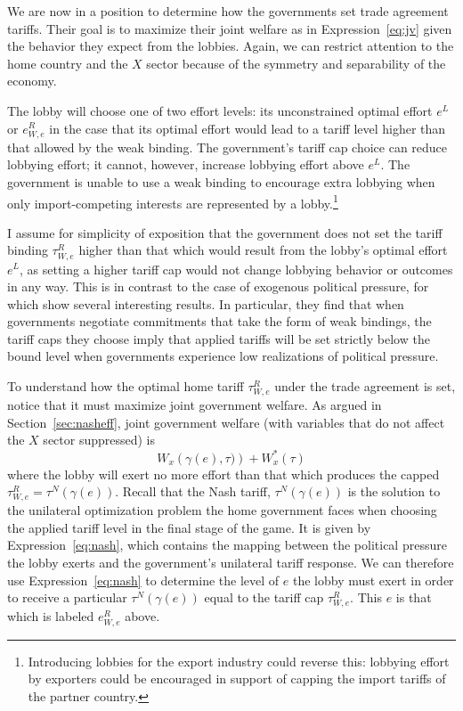\documentclass[12pt]{article}
\newcommand{\ga}{\gamma}
\begin{document}
We are now in a position to determine how the governments set trade agreement tariffs. Their goal is to maximize their joint welfare as in Expression~\ref{eq:jv} given the behavior they expect from the lobbies. Again, we can restrict attention to the home country and the $X$ sector because of the symmetry and separability of the economy.

The lobby will choose one of two effort levels: its unconstrained optimal effort $e^L$ or $e^R_{W,e}$ in the case that its optimal effort would lead to a tariff level higher than that allowed by the weak binding. The government's tariff cap choice can reduce lobbying effort; it cannot, however, increase lobbying effort above $e^L$. The government is unable to use a weak binding to encourage extra lobbying when only import-competing interests are represented by a lobby.\footnote{Introducing lobbies for the export industry could reverse this: lobbying effort by exporters could be encouraged in support of capping the import tariffs of the partner country.}

I assume for simplicity of exposition that the government does not set the tariff binding $\tau^R_{W,e}$ higher than that which would result from the lobby's optimal effort $e^L$, as setting a higher tariff cap would not change lobbying behavior or outcomes in any way. This is in contrast to the case of exogenous political pressure, for which \Textcite{bs2005} show several interesting results. In particular, they find that when governments negotiate commitments that take the form of weak bindings, the tariff caps they choose imply that applied tariffs will be set strictly below the bound level when governments experience low realizations of political pressure.

To understand how the optimal home tariff $\tau^R_{W,e}$ under the trade agreement is set, notice that it must maximize joint government welfare. As argued in Section~\ref{sec:nasheff}, joint government welfare (with variables that do not affect the $X$ sector suppressed) is
  \begin{equation}
		W_x \left(\ga(e),\tau) \right) + W_x^*\left(\tau \right)
	  \label{exp:1}
	\end{equation}
where the lobby will exert no more effort than that which produces the capped $\tau^R_{W,e}=\tau^N(\ga(e))$. Recall that the Nash tariff, $\tau^N(\ga(e))$ is the solution to the unilateral optimization problem the home government faces when choosing the applied tariff level in the final stage of the game. It is given by Expression~\ref{eq:nash}, which contains the mapping between the political pressure the lobby exerts and the government's unilateral tariff response. We can therefore use Expression~\ref{eq:nash} to determine the level of $e$ the lobby must exert in order to receive a particular $\tau^N(\ga(e))$ equal to the tariff cap $\tau^R_{W,e}$. This $e$ is that which is labeled $e^R_{W,e}$ above.
\end{document}
